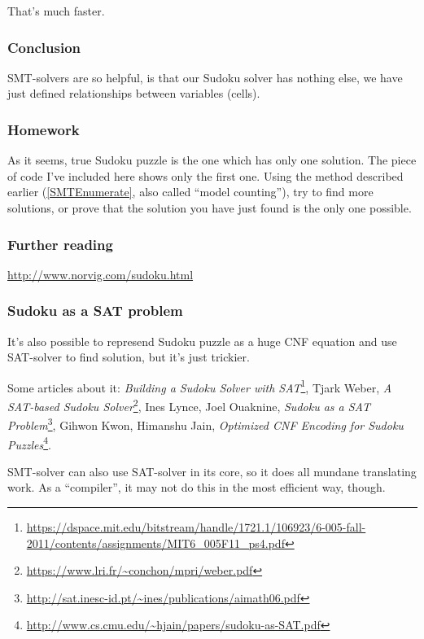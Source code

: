 That's much faster.

\subsubsection{Conclusion}

\ac{SMT}-solvers are so helpful, is that our Sudoku solver has nothing else, we have just defined relationships between variables (cells).

\subsubsection{Homework}

As it seems, true Sudoku puzzle is the one which has only one solution.
The piece of code I've included here shows only the first one.
Using the method described earlier (\ref{SMTEnumerate}, also called ``model counting''), 
try to find more solutions, or prove that the solution you have just found is the only one possible.

\subsubsection{Further reading}

\url{http://www.norvig.com/sudoku.html}

\subsubsection{Sudoku as a \ac{SAT} problem}

It's also possible to represend Sudoku puzzle as a huge \ac{CNF} equation and use \ac{SAT}-solver to find solution, but it's just trickier.

Some articles about it:
\textit{Building a Sudoku Solver with SAT}\footnote{\url{https://dspace.mit.edu/bitstream/handle/1721.1/106923/6-005-fall-2011/contents/assignments/MIT6_005F11_ps4.pdf}},
Tjark Weber, \textit{A SAT-based Sudoku Solver}\footnote{\url{https://www.lri.fr/~conchon/mpri/weber.pdf}},
Ines Lynce, Joel Ouaknine, \textit{Sudoku as a SAT Problem}\footnote{\url{http://sat.inesc-id.pt/~ines/publications/aimath06.pdf}},
Gihwon Kwon, Himanshu Jain, \textit{Optimized CNF Encoding for Sudoku Puzzles}\footnote{\url{http://www.cs.cmu.edu/~hjain/papers/sudoku-as-SAT.pdf}}.

\ac{SMT}-solver can also use \ac{SAT}-solver in its core, so it does all mundane translating work.
As a ``compiler'', it may not do this in the most efficient way, though.

